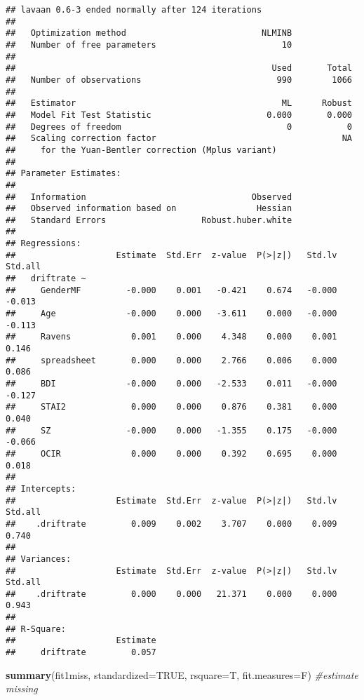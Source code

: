 \documentclass[]{article}
\newenvironment{Shaded}{\begin{snugshade}}{\end{snugshade}}
\newcommand{\KeywordTok}[1]{\textcolor[rgb]{0.13,0.29,0.53}{\textbf{#1}}}
\newcommand{\DataTypeTok}[1]{\textcolor[rgb]{0.13,0.29,0.53}{#1}}
\newcommand{\CommentTok}[1]{\textcolor[rgb]{0.56,0.35,0.01}{\textit{#1}}}
\newcommand{\OtherTok}[1]{\textcolor[rgb]{0.56,0.35,0.01}{#1}}
\newcommand{\NormalTok}[1]{#1}
\begin{document}
\begin{verbatim}
## lavaan 0.6-3 ended normally after 124 iterations
## 
##   Optimization method                           NLMINB
##   Number of free parameters                         10
## 
##                                                   Used       Total
##   Number of observations                           990        1066
## 
##   Estimator                                         ML      Robust
##   Model Fit Test Statistic                       0.000       0.000
##   Degrees of freedom                                 0           0
##   Scaling correction factor                                     NA
##     for the Yuan-Bentler correction (Mplus variant)
## 
## Parameter Estimates:
## 
##   Information                                 Observed
##   Observed information based on                Hessian
##   Standard Errors                   Robust.huber.white
## 
## Regressions:
##                    Estimate  Std.Err  z-value  P(>|z|)   Std.lv  Std.all
##   driftrate ~                                                           
##     GenderMF         -0.000    0.001   -0.421    0.674   -0.000   -0.013
##     Age              -0.000    0.000   -3.611    0.000   -0.000   -0.113
##     Ravens            0.001    0.000    4.348    0.000    0.001    0.146
##     spreadsheet       0.000    0.000    2.766    0.006    0.000    0.086
##     BDI              -0.000    0.000   -2.533    0.011   -0.000   -0.127
##     STAI2             0.000    0.000    0.876    0.381    0.000    0.040
##     SZ               -0.000    0.000   -1.355    0.175   -0.000   -0.066
##     OCIR              0.000    0.000    0.392    0.695    0.000    0.018
## 
## Intercepts:
##                    Estimate  Std.Err  z-value  P(>|z|)   Std.lv  Std.all
##    .driftrate         0.009    0.002    3.707    0.000    0.009    0.740
## 
## Variances:
##                    Estimate  Std.Err  z-value  P(>|z|)   Std.lv  Std.all
##    .driftrate         0.000    0.000   21.371    0.000    0.000    0.943
## 
## R-Square:
##                    Estimate
##     driftrate         0.057
\end{verbatim}

\begin{Shaded}
\begin{Highlighting}[]
\KeywordTok{summary}\NormalTok{(fit1miss, }\DataTypeTok{standardized=}\OtherTok{TRUE}\NormalTok{, }\DataTypeTok{rsquare=}\NormalTok{T, }\DataTypeTok{fit.measures=}\NormalTok{F) }\CommentTok{#estimate missing}
\end{Highlighting}
\end{Shaded}
\end{document}
